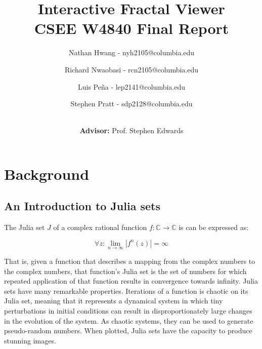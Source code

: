 \documentclass{article}
\begin{document}
\title{Interactive Fractal Viewer \\
CSEE W4840 Final Report}
\author{Nathan Hwang - nyh2105@columbia.edu \and
Richard Nwaobasi - rcn2105@columbia.edu \and
Luis Pe\~{n}a - lep2141@columbia.edu \and
Stephen Pratt - sdp2128@columbia.edu\and
\\
{\textbf{Advisor:} Prof. Stephen Edwards } \\ }

\maketitle
\newpage
{}



\section{Background}
\subsection{An Introduction to Julia sets}

The Julia set $J$ of a complex rational function $f: \mathbb{C} \rightarrow \mathbb{C}$ is can be expressed as:

$$
\forall z: \lim_{n \rightarrow \infty} |f^n(z)| = \infty
$$

That is, given a function that describes a mapping from the complex numbers to the complex numbers, that function's
Julia set is the set of numbers for which repeated application of that function results in convergence towards 
infinity. Julia sets have many remarkable properties. Iterations of a function is chaotic on its Julia set, meaning that it represents a dynamical system in which tiny perturbations in initial conditions can result in disproportionately large changes in 
the evolution of the system. As chaotic systems, they can be used to generate pseudo-random numbers. When plotted,
Julia sets have the capacity to produce stunning images.
\end{document}
